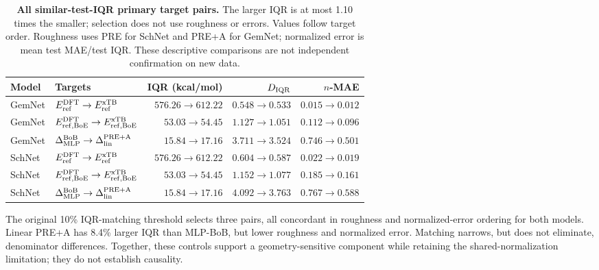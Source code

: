 \begin{table}[H]
\centering\scriptsize
\setlength{\tabcolsep}{4pt}
\renewcommand{\arraystretch}{1.5}
\caption{\textbf{All similar-test-IQR primary target pairs.} The larger IQR is at most 1.10 times the smaller; selection does not use roughness or errors. Values follow target order. Roughness uses PRE for SchNet and PRE+A for GemNet; normalized error is mean test MAE/test IQR. These descriptive comparisons are not independent confirmation on new data.}
\label{tab:test-similar-iqr}
\begin{tabular}{llrrr}\toprule
Model & Targets & IQR (kcal/mol) & $D_{\rm IQR}$ & $n$-MAE \\
\midrule
GemNet & $E^{\rm DFT}_{\rm ref}\to E^{\rm xTB}_{\rm ref}$ & $576.26\to612.22$ & $0.548\to0.533$ & $0.015\to0.012$ \\
GemNet & $E^{\rm DFT}_{\rm ref,BoE}\to E^{\rm xTB}_{\rm ref,BoE}$ & $53.03\to54.45$ & $1.127\to1.051$ & $0.112\to0.096$ \\
GemNet & $\Delta^{\rm BoB}_{\rm MLP}\to\Delta^{\rm PRE+A}_{\rm lin}$ & $15.84\to17.16$ & $3.711\to3.524$ & $0.746\to0.501$ \\
SchNet & $E^{\rm DFT}_{\rm ref}\to E^{\rm xTB}_{\rm ref}$ & $576.26\to612.22$ & $0.604\to0.587$ & $0.022\to0.019$ \\
SchNet & $E^{\rm DFT}_{\rm ref,BoE}\to E^{\rm xTB}_{\rm ref,BoE}$ & $53.03\to54.45$ & $1.152\to1.077$ & $0.185\to0.161$ \\
SchNet & $\Delta^{\rm BoB}_{\rm MLP}\to\Delta^{\rm PRE+A}_{\rm lin}$ & $15.84\to17.16$ & $4.092\to3.763$ & $0.767\to0.588$ \\
\bottomrule\end{tabular}
\end{table}

The original 10\% IQR-matching threshold selects three pairs, all concordant in roughness and normalized-error ordering for both models. Linear PRE+A has 8.4\% larger IQR than MLP-BoB, but lower roughness and normalized error. Matching narrows, but does not eliminate, denominator differences. Together, these controls support a geometry-sensitive component while retaining the shared-normalization limitation; they do not establish causality.

